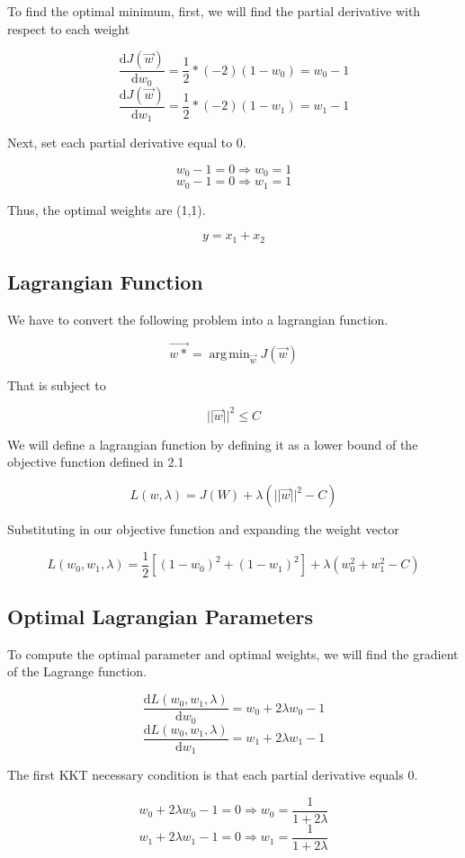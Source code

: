 \documentclass{article}
\DeclareMathOperator*{\argminA}{arg\,min}
\begin{document}
To find the optimal minimum, first, we will find the partial derivative with respect to each weight

\[\frac{\mathrm{d}J(\Vec{w})}{\mathrm{d}w_0} = \frac{1}{2} * (-2) (1 - w_0) = w_0 - 1 \]
\[\frac{\mathrm{d}J(\Vec{w})}{\mathrm{d}w_1} = \frac{1}{2} * (-2) (1 - w_1) = w_1 - 1 \]

Next, set each partial derivative equal to 0.

\[w_0 - 1 = 0 \Rightarrow w_0 = 1\]
\[w_0 - 1 = 0 \Rightarrow w_1 = 1\]

Thus, the optimal weights are (1,1).

\[y = x_1 + x_2\]

\subsection{Lagrangian Function}

We have to convert the following problem into a lagrangian function.

\[\Vec{w*} = \argminA_{\Vec{w}} J(\Vec{w})\]

That is subject to

\[||\Vec{w}||^2 \leq C\]

We will define a lagrangian function by defining it as a lower bound of the objective function defined in 2.1

\[L(w, \lambda) = J(W) + \lambda( ||\Vec{w}||^2 - C )\]

Substituting in our objective function and expanding the weight vector

\[L(w_0, w_1, \lambda) = \frac{1}{2} [(1 - w_0)^2 + (1 - w_1)^2]  + \lambda( w_0^2 + w_1^2 - C )\]

\subsection{Optimal Lagrangian Parameters}
To compute the optimal parameter and optimal weights, we will find the gradient of the Lagrange function.

\[\frac{\mathrm{d}L(w_0, w_1, \lambda)}{\mathrm{d}w_0} = w_0 + 2\lambda w_0 - 1 \]
\[\frac{\mathrm{d}L(w_0, w_1, \lambda)}{\mathrm{d}w_1} = w_1 + 2\lambda w_1 - 1 \]

The first KKT necessary condition is that each partial derivative equals 0.

\[w_0 + 2\lambda w_0 - 1 = 0 \Rightarrow w_0 = \frac{1}{1+2\lambda}\]
\[w_1 + 2\lambda w_1 - 1 = 0 \Rightarrow w_1 = \frac{1}{1+2\lambda}\]
\end{document}
